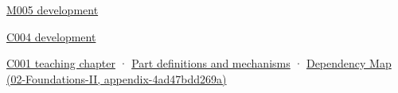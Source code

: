 \href{Continuous\%20Notes/Computing\%20Foundations\%20-\%20From\%20Bits\%20to\%20C++\%20and\%20Systems\%20APIs\#When\%20arithmetic\%20meets\%20uncertainty}{M005 development}

\href{Continuous\%20Notes/Computing\%20Foundations\%20-\%20From\%20Bits\%20to\%20C++\%20and\%20Systems\%20APIs\#A\%20stretching\%20ruler\%20for\%20real-valued\%20quantities}{C004 development}

\href{Continuous\%20Notes/Computing\%20Foundations\%20-\%20From\%20Bits\%20to\%20C++\%20and\%20Systems\%20APIs\#From\%20a\%20signal\%20to\%20an\%20interpretation}{C001 teaching chapter} · \hyperref[appendix-fd090d982a15]{Part definitions and mechanisms} · \href{../02-Foundations-II/main.pdf\#nameddest=appendix-4ad47bdd269a}{Dependency Map (02-Foundations-II, appendix-4ad47bdd269a)}
